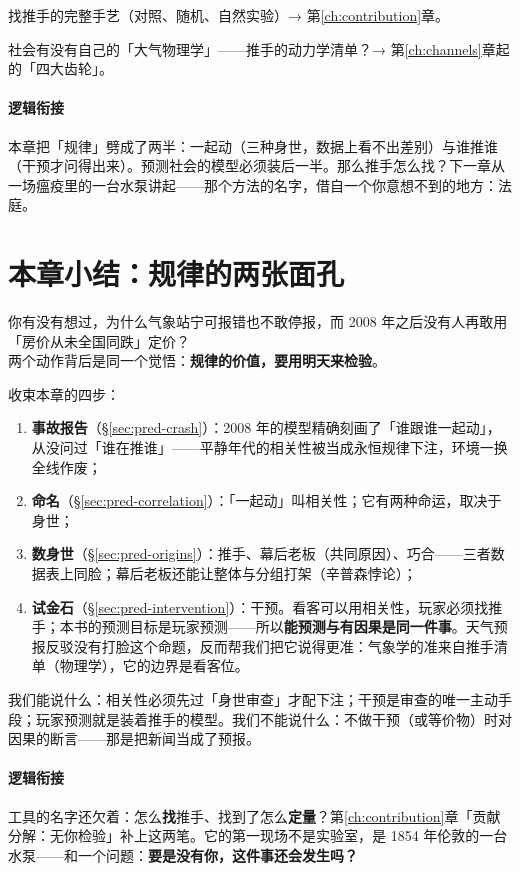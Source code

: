 \documentclass[../../main2.tex]{subfiles}
\begin{document}
	\begin{reader_anticipation}
		\item 找推手的完整手艺（对照、随机、自然实验）→ 第\ref{ch:contribution}章。
		\item 社会有没有自己的「大气物理学」——推手的动力学清单？→ 第\ref{ch:channels}章起的「四大齿轮」。
	\end{reader_anticipation}

	\paragraph*{逻辑衔接}
	本章把「规律」劈成了两半：一起动（三种身世，数据上看不出差别）与谁推谁（干预才问得出来）。预测社会的模型必须装后一半。那么推手怎么找？下一章从一场瘟疫里的一台水泵讲起——那个方法的名字，借自一个你意想不到的地方：法庭。

	\section{本章小结：规律的两张面孔}
	\label{sec:pred-summary}

	\begin{readingnote}
		你有没有想过，为什么气象站宁可报错也不敢停报，而 2008 年之后没有人再敢用「房价从未全国同跌」定价？\\
		两个动作背后是同一个觉悟：\textbf{规律的价值，要用明天来检验}。
	\end{readingnote}

	收束本章的四步：
	\begin{enumerate}
		\item \textbf{事故报告}（§\ref{sec:pred-crash}）：2008 年的模型精确刻画了「谁跟谁一起动」，从没问过「谁在推谁」——平静年代的相关性被当成永恒规律下注，环境一换全线作废；
		\item \textbf{命名}（§\ref{sec:pred-correlation}）：「一起动」叫相关性；它有两种命运，取决于身世；
		\item \textbf{数身世}（§\ref{sec:pred-origins}）：推手、幕后老板（共同原因）、巧合——三者数据表上同脸；幕后老板还能让整体与分组打架（辛普森悖论）；
		\item \textbf{试金石}（§\ref{sec:pred-intervention}）：干预。看客可以用相关性，玩家必须找推手；本书的预测目标是玩家预测——所以\textbf{能预测与有因果是同一件事}。天气预报反驳没有打脸这个命题，反而帮我们把它说得更准：气象学的准来自推手清单（物理学），它的边界是看客位。
	\end{enumerate}

	我们能说什么：相关性必须先过「身世审查」才配下注；干预是审查的唯一主动手段；玩家预测就是装着推手的模型。我们不能说什么：不做干预（或等价物）时对因果的断言——那是把新闻当成了预报。

	\paragraph*{逻辑衔接}
	工具的名字还欠着：怎么\textbf{找}推手、找到了怎么\textbf{定量}？第\ref{ch:contribution}章「贡献分解：无你检验」补上这两笔。它的第一现场不是实验室，是 1854 年伦敦的一台水泵——和一个问题：\textbf{要是没有你，这件事还会发生吗？}
\end{document}
